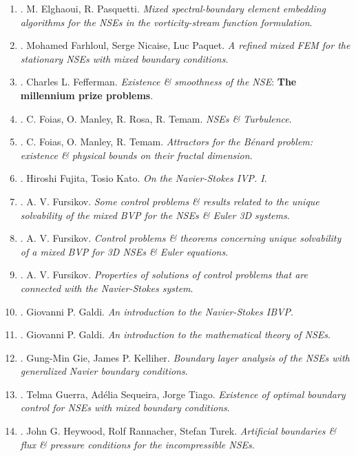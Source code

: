 \documentclass{article}
\begin{document}
\begin{enumerate}
	\item \cite{Elghaoui_Pasquetti1999}. {\sc M.  Elghaoui, R. Pasquetti}. {\it Mixed spectral-boundary element embedding algorithms for the NSEs in the vorticity-stream function formulation}.
	\item \cite{Farhloul_Nicaise_Paquet2008}. {\sc Mohamed Farhloul, Serge Nicaise, Luc Paquet}. {\it A refined mixed FEM for the stationary NSEs with mixed boundary conditions}.
	\item \cite{Fefferman2006}. {\sc Charles L. Fefferman}. {\it Existence \& smoothness of the NSE}: {\bf The millennium prize problems}.
	\item \cite{Foias_Manley_Rosa_Temam2001}. {\sc C. Foias, O. Manley, R. Rosa, R. Temam}. {\it NSEs \& Turbulence}.
	\item \cite{Foias_Manley_Temam1987}. {\sc C. Foias, O. Manley,  R. Temam}. {\it Attractors for the B\'{e}nard problem: existence \& physical bounds on their fractal dimension}.
	\item \cite{Fujita_Kato1964}. {\sc Hiroshi Fujita, Tosio Kato}. {\it On the Navier-Stokes IVP. I}.
	\item \cite{Fursikov1980}. {\sc A. V. Fursikov}. {\it Some control problems \& results related to the unique solvability of the mixed BVP for the NSEs \& Euler 3D systems}.
	\item \cite{Fursikov1981}. {\sc A. V. Fursikov}. {\it Control problems \& theorems concerning unique solvability of a mixed BVP for 3D NSEs \& Euler equations}.
	\item \cite{Fursikov1982}. {\sc A. V. Fursikov}. {\it Properties of solutions of control problems that are connected with the Navier-Stokes system}.
	\item \cite{Galdi2000}. {\sc Giovanni P. Galdi}. {\it An introduction to the Navier-Stokes IBVP}.
	\item \cite{Galdi2011}. {\sc Giovanni P. Galdi}. {\it An introduction to the mathematical theory of NSEs}.
	\item \cite{Gie_Kelliher2012}. {\sc Gung-Min Gie, James P. Kelliher}. {\it Boundary layer analysis of the NSEs with generalized Navier boundary conditions}.
	\item \cite{Guerra_Sequeira2015}. {\sc Telma Guerra,  Ad\'{e}lia Sequeira, Jorge Tiago}. {\it Existence of optimal boundary control for NSEs with mixed boundary conditions}.
	\item \cite{Heywood_Rannacher_Turek1996}. {\sc John G. Heywood, Rolf Rannacher, Stefan Turek}. {\it Artificial boundaries \& flux \& pressure conditions for the incompressible NSEs}.

\end{enumerate}
\end{document}
